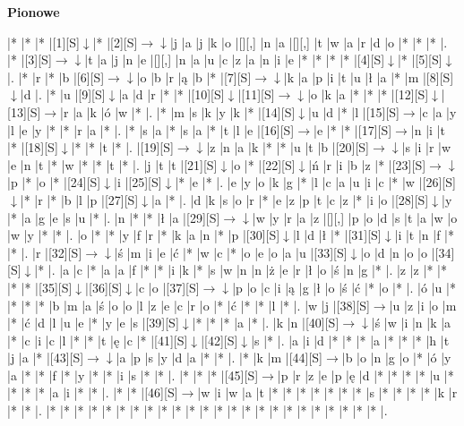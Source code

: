 \documentclass[11pt]{article}
\newcommand\drarr{$\rightarrow \!\!\!\!\! \downarrow$}
\newcommand\rarr{$\rightarrow$}
\newcommand\darr{$\downarrow$}
\begin{document}
\begin{PuzzleClues}{\textbf{Pionowe}\\}
\end{PuzzleClues}\newpage%

\noindent\begin{Puzzle}{23}{22}|*	|*	|*	|[1][S]\darr	|*	|[2][S]\drarr	|j	|a	|j	|k	|o	|[][,]{ }	|n	|a	|[][,]{ }	|t	|w	|a	|r	|d	|o	|*	|*	|*	|.
|*	|[3][S]\drarr	|t	|a	|j	|n	|e	|[][,]{ }	|n	|a	|u	|c	|z	|a	|n	|i	|e	|*	|*	|*	|*	|[4][S]\darr	|*	|[5][S]\darr	|.
|*	|r	|*	|b	|[6][S]\drarr	|o	|b	|r	|ą	|b	|*	|[7][S]\drarr	|k	|a	|p	|i	|t	|u	|ł	|a	|*	|m	|[8][S]\darr	|d	|.
|*	|u	|[9][S]\darr	|a	|d	|r	|*	|*	|[10][S]\darr	|[11][S]\drarr	|o	|k	|a	|*	|*	|*	|[12][S]\darr	|[13][S]\rarr	|r	|a	|k	|ó	|w	|*	|.
|*	|m	|s	|k	|y	|k	|*	|[14][S]\darr	|u	|d	|*	|l	|[15][S]\rarr	|c	|a	|y	|l	|e	|y	|*	|*	|r	|a	|*	|.
|*	|s	|a	|*	|s	|a	|*	|t	|l	|e	|[16][S]\rarr	|e	|*	|*	|[17][S]\rarr	|n	|i	|t	|*	|[18][S]\darr	|*	|*	|t	|*	|.
|[19][S]\drarr	|z	|n	|a	|k	|*	|*	|u	|t	|b	|[20][S]\drarr	|s	|i	|r	|w	|e	|n	|t	|*	|w	|*	|*	|t	|*	|.
|j	|t	|t	|[21][S]\darr	|o	|*	|[22][S]\darr	|ń	|r	|i	|b	|z	|*	|[23][S]\drarr	|p	|*	|o	|*	|[24][S]\darr	|i	|[25][S]\darr	|*	|e	|*	|.
|e	|y	|o	|k	|g	|*	|l	|c	|a	|u	|i	|c	|*	|w	|[26][S]\darr	|*	|r	|*	|b	|l	|p	|[27][S]\darr	|a	|*	|.
|d	|k	|s	|o	|r	|*	|e	|z	|p	|t	|c	|z	|*	|i	|o	|[28][S]\darr	|y	|*	|a	|g	|e	|s	|u	|*	|.
|n	|*	|*	|ł	|a	|[29][S]\drarr	|w	|y	|r	|a	|z	|[][,]{ }	|p	|o	|d	|s	|t	|a	|w	|o	|w	|y	|*	|*	|.
|o	|*	|*	|y	|f	|r	|*	|k	|a	|n	|*	|p	|[30][S]\darr	|l	|d	|ł	|*	|[31][S]\darr	|i	|t	|n	|f	|*	|*	|.
|r	|[32][S]\drarr	|ś	|m	|i	|e	|ć	|*	|w	|c	|*	|o	|e	|o	|a	|u	|[33][S]\darr	|o	|d	|n	|o	|o	|[34][S]\darr	|*	|.
|a	|c	|*	|a	|a	|f	|*	|*	|i	|k	|*	|s	|w	|n	|n	|ż	|e	|r	|ł	|o	|ś	|n	|g	|*	|.
|z	|z	|*	|*	|*	|*	|[35][S]\darr	|[36][S]\darr	|c	|o	|[37][S]\drarr	|p	|o	|c	|i	|ą	|g	|ł	|o	|ś	|ć	|*	|o	|*	|.
|ó	|u	|*	|*	|*	|*	|b	|m	|a	|ś	|o	|o	|l	|z	|e	|c	|r	|o	|*	|ć	|*	|*	|l	|*	|.
|w	|j	|[38][S]\rarr	|u	|z	|i	|o	|m	|*	|ć	|d	|l	|u	|e	|*	|y	|e	|s	|[39][S]\darr	|*	|*	|*	|a	|*	|.
|k	|n	|[40][S]\drarr	|ś	|w	|i	|n	|k	|a	|*	|c	|i	|c	|l	|*	|*	|t	|ę	|c	|*	|[41][S]\darr	|[42][S]\darr	|s	|*	|.
|a	|i	|d	|*	|*	|*	|a	|*	|*	|*	|h	|t	|j	|a	|*	|[43][S]\drarr	|a	|p	|s	|y	|d	|a	|*	|*	|.
|*	|k	|m	|[44][S]\rarr	|b	|o	|n	|g	|o	|*	|ó	|y	|a	|*	|*	|f	|*	|y	|*	|*	|i	|s	|*	|*	|.
|*	|*	|*	|[45][S]\rarr	|p	|r	|z	|e	|p	|ę	|d	|*	|*	|*	|*	|u	|*	|*	|*	|*	|a	|i	|*	|*	|.
|*	|*	|[46][S]\rarr	|w	|i	|w	|a	|t	|*	|*	|*	|*	|*	|*	|*	|s	|*	|*	|*	|*	|k	|r	|*	|*	|.
|*	|*	|*	|*	|*	|*	|*	|*	|*	|*	|*	|*	|*	|*	|*	|*	|*	|*	|*	|*	|*	|*	|*	|*	|.\end{Puzzle}
\end{document}

